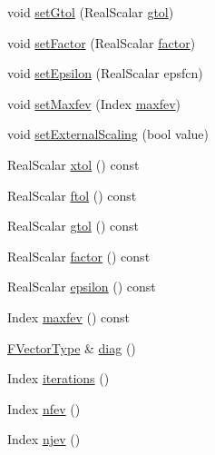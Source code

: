 \begin{DoxyCompactItemize}
\item 
void \hyperlink{class_eigen_1_1_levenberg_marquardt_ad5610b2353f1ce5e0c7357ed1b215fea}{set\+Gtol} (Real\+Scalar \hyperlink{class_eigen_1_1_levenberg_marquardt_a18597c537ec7d492ee6d43788178e458}{gtol})
\item 
void \hyperlink{class_eigen_1_1_levenberg_marquardt_a3054eeba042b197ae8d415729770db69}{set\+Factor} (Real\+Scalar \hyperlink{class_eigen_1_1_levenberg_marquardt_a282e28b8331376b9875429dab1e280ba}{factor})
\item 
void \hyperlink{class_eigen_1_1_levenberg_marquardt_a3e13f6631ae59be984ee1ea196899cd7}{set\+Epsilon} (Real\+Scalar epsfcn)
\item 
void \hyperlink{class_eigen_1_1_levenberg_marquardt_af072d0f89c44415d8ed284df8b4a634a}{set\+Maxfev} (Index \hyperlink{class_eigen_1_1_levenberg_marquardt_a495894dde1fedfba97721f6b4a076901}{maxfev})
\item 
void \hyperlink{class_eigen_1_1_levenberg_marquardt_a4af7d41545ec5908485357493839e6f6}{set\+External\+Scaling} (bool value)
\item 
Real\+Scalar \hyperlink{class_eigen_1_1_levenberg_marquardt_a25a7629ea877d8f08670536b3d234897}{xtol} () const
\item 
Real\+Scalar \hyperlink{class_eigen_1_1_levenberg_marquardt_a957ac071ec775779bb03d10b463ddfbc}{ftol} () const
\item 
Real\+Scalar \hyperlink{class_eigen_1_1_levenberg_marquardt_a18597c537ec7d492ee6d43788178e458}{gtol} () const
\item 
Real\+Scalar \hyperlink{class_eigen_1_1_levenberg_marquardt_a282e28b8331376b9875429dab1e280ba}{factor} () const
\item 
Real\+Scalar \hyperlink{class_eigen_1_1_levenberg_marquardt_aac799068926ca0bc3387b2dc5c0eb113}{epsilon} () const
\item 
Index \hyperlink{class_eigen_1_1_levenberg_marquardt_a495894dde1fedfba97721f6b4a076901}{maxfev} () const
\item 
\hyperlink{group___core___module}{F\+Vector\+Type} \& \hyperlink{class_eigen_1_1_levenberg_marquardt_a6e237ca1f23cdf5caa98fe23c6bcf464}{diag} ()
\item 
Index \hyperlink{class_eigen_1_1_levenberg_marquardt_aeb094683f0abe9c29ee89be0677de744}{iterations} ()
\item 
Index \hyperlink{class_eigen_1_1_levenberg_marquardt_ad9563c6abeb33c0aba82e55fd72c64a6}{nfev} ()
\item 
Index \hyperlink{class_eigen_1_1_levenberg_marquardt_a31bedcc92106ed170fde5750559a62a5}{njev} ()

\end{DoxyCompactItemize}
